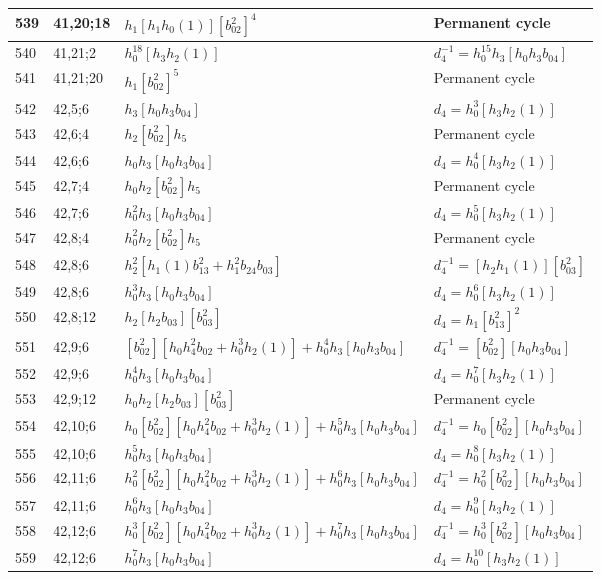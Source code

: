 \documentclass{article}
\begin{document}
\begin{longtable}{|l|l|>{\raggedright\arraybackslash}p{6cm}|>{\raggedright\arraybackslash}p{6cm}|}
\hline
539 & 41,20;18 & $h_1[h_1h_0(1)][b_{02}^2]^4$ & Permanent cycle\\
\hline
540 & 41,21;2 & $h_0^{18}[h_3h_2(1)]$ & $d_{4}^{-1}=h_0^{15}h_3[h_0h_3b_{04}]$\\
\hline
541 & 41,21;20 & $h_1[b_{02}^2]^5$ & Permanent cycle\\
\hline
542 & 42,5;6 & $h_3[h_0h_3b_{04}]$ &$d_{4}=h_0^3[h_3h_2(1)]$\\
\hline
543 & 42,6;4 & $h_2[b_{02}^2]h_5$ & Permanent cycle\\
\hline
544 & 42,6;6 & $h_0h_3[h_0h_3b_{04}]$ &$d_{4}=h_0^4[h_3h_2(1)]$\\
\hline
545 & 42,7;4 & $h_0h_2[b_{02}^2]h_5$ & Permanent cycle\\
\hline
546 & 42,7;6 & $h_0^2h_3[h_0h_3b_{04}]$ &$d_{4}=h_0^5[h_3h_2(1)]$\\
\hline
547 & 42,8;4 & $h_0^2h_2[b_{02}^2]h_5$ & Permanent cycle\\
\hline
548 & 42,8;6 & $h_2^2[h_1(1)b_{13}^2 + h_1^2b_{24}b_{03}]$ & $d_{4}^{-1}=[h_2h_1(1)][b_{03}^2]$\\
549 & 42,8;6 & $h_0^3h_3[h_0h_3b_{04}]$ &$d_{4}=h_0^6[h_3h_2(1)]$\\
\hline
550 & 42,8;12 & $h_2[h_2b_{03}][b_{03}^2]$ &$d_{4}=h_1[b_{13}^2]^2$\\
\hline
551 & 42,9;6 & $[b_{02}^2][h_0h_4^2b_{02} + h_0^3h_2(1)] + h_0^4h_3[h_0h_3b_{04}]$ & $d_{4}^{-1}=[b_{02}^2][h_0h_3b_{04}]$\\
552 & 42,9;6 & $h_0^4h_3[h_0h_3b_{04}]$ &$d_{4}=h_0^7[h_3h_2(1)]$\\
\hline
553 & 42,9;12 & $h_0h_2[h_2b_{03}][b_{03}^2]$ & Permanent cycle\\
\hline
554 & 42,10;6 & $h_0[b_{02}^2][h_0h_4^2b_{02} + h_0^3h_2(1)] + h_0^5h_3[h_0h_3b_{04}]$ & $d_{4}^{-1}=h_0[b_{02}^2][h_0h_3b_{04}]$\\
555 & 42,10;6 & $h_0^5h_3[h_0h_3b_{04}]$ &$d_{4}=h_0^8[h_3h_2(1)]$\\
\hline
556 & 42,11;6 & $h_0^2[b_{02}^2][h_0h_4^2b_{02} + h_0^3h_2(1)] + h_0^6h_3[h_0h_3b_{04}]$ & $d_{4}^{-1}=h_0^2[b_{02}^2][h_0h_3b_{04}]$\\
557 & 42,11;6 & $h_0^6h_3[h_0h_3b_{04}]$ &$d_{4}=h_0^9[h_3h_2(1)]$\\
\hline
558 & 42,12;6 & $h_0^3[b_{02}^2][h_0h_4^2b_{02} + h_0^3h_2(1)] + h_0^7h_3[h_0h_3b_{04}]$ & $d_{4}^{-1}=h_0^3[b_{02}^2][h_0h_3b_{04}]$\\
559 & 42,12;6 & $h_0^7h_3[h_0h_3b_{04}]$ &$d_{4}=h_0^{10}[h_3h_2(1)]$\\

\end{longtable}
\end{document}
